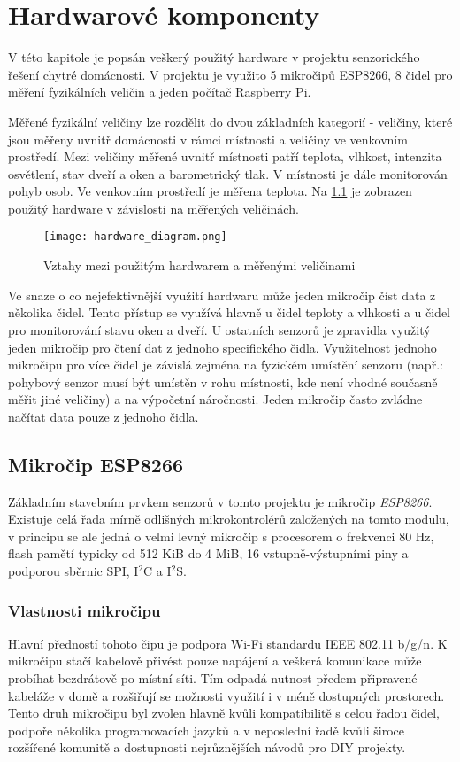 \chapter{Hardwarové komponenty} \label{chap:hardware}
V této kapitole je popsán veškerý použitý hardware v projektu senzorického řešení chytré domácnosti. V projektu je využito 5 mikročipů ESP8266, 8 čidel pro měření fyzikálních veličin a jeden počítač Raspberry Pi. 

Měřené fyzikální veličiny lze rozdělit do dvou základních kategorií - veličiny, které jsou měřeny uvnitř domácnosti v rámci místnosti a veličiny ve venkovním prostředí. Mezi veličiny měřené uvnitř místnosti patří teplota, vlhkost, intenzita osvětlení, stav dveří a oken a barometrický tlak. V místnosti je dále monitorován pohyb osob. Ve venkovním prostředí je měřena teplota. Na \cref{fig:hardware_diagram} je zobrazen použitý hardware v závislosti na měřených veličinách. 

\begin{figure}[H]
  \centering
  \texttt{[image: hardware\_diagram.png]}
  \caption{Vztahy mezi použitým hardwarem a měřenými veličinami}
  \label{fig:hardware_diagram}
\end{figure}

Ve snaze o co nejefektivnější využití hardwaru může jeden mikročip číst data z několika čidel. Tento přístup se využívá hlavně u čidel teploty a vlhkosti a u čidel pro monitorování stavu oken a dveří. U ostatních senzorů je zpravidla využitý jeden mikročip pro čtení dat z jednoho specifického čidla. Využitelnost jednoho mikročipu pro více čidel je závislá zejména na fyzickém umístění senzoru (např.: pohybový senzor musí být umístěn v rohu místnosti, kde není vhodné současně měřit jiné veličiny) a na výpočetní náročnosti. Jeden mikročip často zvládne načítat data pouze z jednoho čidla.

\section{Mikročip ESP8266} \label{sec:esp8266}

Základním stavebním prvkem senzorů v tomto projektu je mikročip \textit{ESP8266}. Existuje celá řada mírně odlišných mikrokontrolérů založených na tomto modulu, v principu se ale jedná o velmi levný mikročip s procesorem o frekvenci 80 Hz, flash pamětí typicky od 512 KiB do 4 MiB, 16 vstupně-výstupními piny a podporou sběrnic SPI,  I$^2$C a I$^2$S.

\subsection*{Vlastnosti mikročipu}
Hlavní předností tohoto čipu je podpora Wi-Fi standardu IEEE 802.11 b/g/n. K mikročipu stačí kabelově přivést pouze napájení a veškerá komunikace může probíhat bezdrátově po místní síti. Tím odpadá nutnost předem připravené kabeláže v domě a rozšiřují se možnosti využití i v méně dostupných prostorech. Tento druh mikročipu byl zvolen hlavně kvůli kompatibilitě s celou řadou čidel, podpoře několika programovacích jazyků a v neposlední řadě kvůli široce rozšířené komunitě a dostupnosti nejrůznějších návodů pro DIY projekty.

